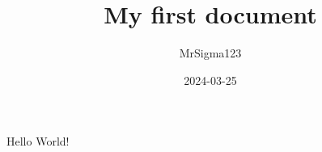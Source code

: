 \documentclass{article}
\title{My first document}
\date{2024-03-25}
\author{MrSigma123}
\begin{document}
	\maketitle
	\newpage
	
	Hello World!
\end{document}
